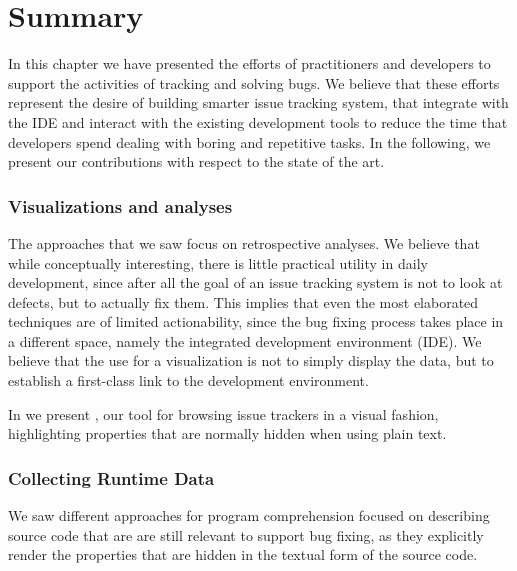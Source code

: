 

\section{Summary}

In this chapter we have presented the efforts of practitioners and developers to support the activities of tracking and solving bugs.
We believe that these efforts represent the desire of building smarter issue tracking system, that integrate with the IDE and interact with the existing development tools to reduce the time that developers spend dealing with boring and repetitive tasks.
In the following, we present our contributions with respect to the state of the art.


\subsubsection{Visualizations and analyses}

The approaches that we saw focus on retrospective analyses.
We believe that while conceptually interesting, there is little practical utility in daily development, since after all the goal of an issue tracking system is not to look at defects, but to actually fix them.
This implies that even the most elaborated techniques are of limited actionability, since the bug fixing process takes place in a different space, namely the integrated development environment (IDE).
We believe that the use for a visualization is not to simply display the data, but to establish a first-class link to the development environment.

In  we present \ib, our tool for browsing issue trackers in a visual fashion, highlighting properties that are normally hidden when using plain text.


\subsubsection{Collecting Runtime Data}

We saw different approaches for program comprehension focused on describing source code that are are still relevant to support bug fixing, as they explicitly render the properties that are hidden in the textual form of the source code.

